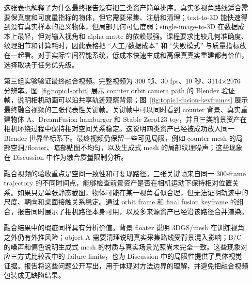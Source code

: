 \documentclass{article}
\begin{document}
	这张表也解释了为什么最终报告没有把三类资产简单排序。真实多视角路线适合需要保真度和可度量指标的物体，但它需要采集、注册和清理；text-to-3D 能快速得到没有真实样本的语义物体，但局部几何可信度弱；single-image-to-3D 在数据成本上最轻，但对输入视角和 alpha matte 的依赖最强。课程要求比较几何准确度、纹理细节和计算耗时，因此表格把 ``人工/数据成本'' 和 ``失败模式'' 与质量指标放在一起看。对于实际空间智能系统，低成本快速生成和高保真真实重建都有价值，选择取决于任务优先级。

	第三组实验验证最终融合视频。完整视频为 300 帧、30 fps、10 秒、3114$\times$2076 分辨率。图~\ref{fig:topic1-orbit} 展示 counter orbit camera path 的 Blender 验证帧，说明相机动画可以沿共享轨迹观察背景；图~\ref{fig:topic1-fusion-keyframes} 展示最终融合视频的三张代表性关键帧。关键帧中可以同时看到 counter 背景、真实重建物体 A、DreamFusion hamburger 和 Stable Zero123 toy，并且三类前景资产在相机环绕过程中保持相对空间关系稳定。这说明四类资产已经被成功放入同一 Blender 世界坐标系下。最终视频仍保留一些可见局限，例如 counter mesh 的局部空洞/floater、暗部贴图不均匀，以及生成式 mesh 的局部纹理噪声；这些现象在 Discussion 中作为融合质量限制分析。

	融合视频的验收重点是空间一致性和可复现路径。三张关键帧来自同一 300-frame trajectory 的不同时间点，能够检查前景资产是否在相机运动下保持相对位置关系。如果只是单张静态截图，物体可能在某一视角看似合理，但无法证明轨迹中的尺度、朝向和桌面接触关系稳定。通过 orbit frame 和 final fusion keyframe 的组合，报告同时展示了相机路径本身可用，以及多来源资产已经沿该路径合并渲染。

	融合结果中的瑕疵同样具有分析价值。背景 floater 说明 3DGS/mesh 在训练视角之外仍有外推风险；object A 需要清理说明真实采集路线受背景混入影响；B/C 的噪声和偏色说明生成式 mesh 的材质与真实场景光照尚未完全一致。这些现象对应三方式比较表中的 failure limits，也为 Discussion 中的局限性提供了具体视觉证据。报告将这些问题公开写出，用于体现对方法边界的理解，并避免把融合视频包装成无缺陷结果。
\end{document}
